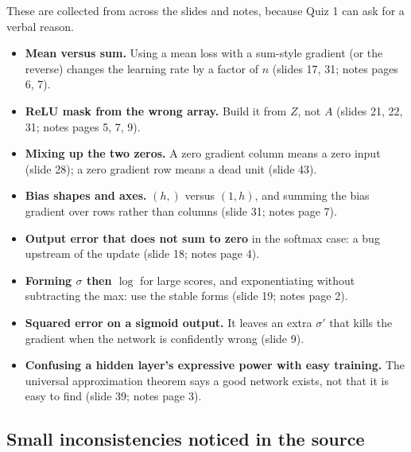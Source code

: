 These are collected from across the slides and notes, because Quiz 1 can ask for a verbal reason.
\begin{itemize}
\item \textbf{Mean versus sum.} Using a mean loss with a sum-style gradient (or the reverse) changes the learning rate by a factor of $n$ (slides 17, 31; notes pages 6, 7).
\item \textbf{ReLU mask from the wrong array.} Build it from $Z$, not $A$ (slides 21, 22, 31; notes pages 5, 7, 9).
\item \textbf{Mixing up the two zeros.} A zero gradient column means a zero input (slide 28); a zero gradient row means a dead unit (slide 43).
\item \textbf{Bias shapes and axes.} $(h,)$ versus $(1,h)$, and summing the bias gradient over rows rather than columns (slide 31; notes page 7).
\item \textbf{Output error that does not sum to zero} in the softmax case: a bug upstream of the update (slide 18; notes page 4).
\item \textbf{Forming $\sigma$ then $\log$} for large scores, and exponentiating without subtracting the max: use the stable forms (slide 19; notes page 2).
\item \textbf{Squared error on a sigmoid output.} It leaves an extra $\sigma'$ that kills the gradient when the network is confidently wrong (slide 9).
\item \textbf{Confusing a hidden layer's expressive power with easy training.} The universal approximation theorem says a good network exists, not that it is easy to find (slide 39; notes page 3).
\end{itemize}

\subsection{Small inconsistencies noticed in the source}

